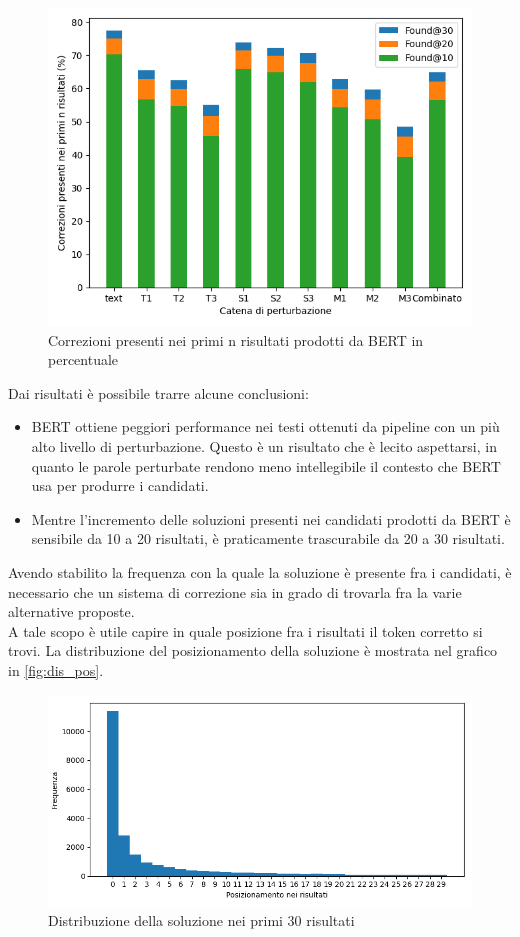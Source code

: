 \documentclass[12pt]{article}
\begin{document}
\begin{figure}[H]
\centering
\includegraphics[width=.9\textwidth]{distributions/overview.png}
\caption{Correzioni presenti nei primi n risultati prodotti da BERT in percentuale}
\label{fig:foundN}
\end{figure}

Dai risultati è possibile trarre alcune conclusioni:
\begin{itemize}
\item BERT ottiene peggiori performance nei testi ottenuti da pipeline con un più alto livello di perturbazione. Questo è un risultato che è lecito aspettarsi, in quanto le parole perturbate rendono meno intellegibile il contesto che BERT usa per produrre i candidati.
\item Mentre l'incremento delle soluzioni presenti nei candidati prodotti da BERT è sensibile  da 10 a 20 risultati, è praticamente trascurabile da 20 a 30 risultati.
\end{itemize}

Avendo stabilito la frequenza con la quale la soluzione è presente fra i candidati, è necessario che un sistema di correzione sia in grado di trovarla fra la varie alternative proposte.\\
A tale scopo è utile capire in quale posizione fra i risultati il token corretto si trovi. La distribuzione del posizionamento della soluzione è mostrata nel grafico in \autoref{fig:dis_pos}.

\begin{figure}[H]
\centering
\includegraphics[width=\textwidth]{distributions/score_order_Combinato}
\caption{Distribuzione della soluzione nei primi 30 risultati}
\label{fig:dis_pos}
\end{figure}
\end{document}
